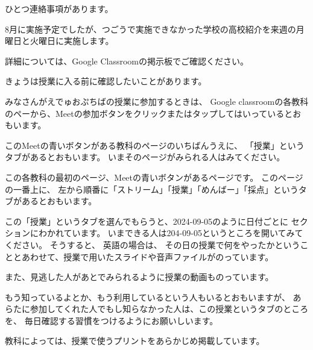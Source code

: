 \documentclass[book,jafontscale=0.9247]{jlreq}
\begin{document}
\newpage

ひとつ連絡事項があります。

8月に実施予定でしたが、つごうで実施できなかった学校の高校紹介を来週の月曜日と火曜日に実施します。

詳細については、Google Classroomの掲示板でご確認ください。


\newpage

きょうは授業に入る前に確認したいことがあります。

みなさんがえでゅおぷちばの授業に参加するときは、
Google classroomの各教科のペーから、Meetの参加ボタンをクリックまたはタップしてはいっているとおもいます。

このMeetの青いボタンがある教科のページのいちばんうえに、
「授業」というタブがあるとおもいます。
いまそのページがみられる人はみてください。

この各教科の最初のページ、Meetの青いボタンがあるページです。
このページの一番上に、
左から順番に「ストリーム」「授業」「めんばー」「採点」というタブがあるとおもいます。

この「授業」というタブを選んでもらうと、2024-09-05のように日付ごとに
セクションにわかれています。
いまできる人は204-09-05というところを開いてみてください。
そうすると、
英語の場合は、
その日の授業で何をやったかということとあわせて、授業で用いたスライドや音声ファイルがのっています。

また、見逃した人があとでみられるように授業の動画ものっています。

もう知っているよとか、もう利用しているという人もいるとおもいますが、
あらたに参加してくれた人でもし知らなかった人は、この授業というタブのところを、
毎日確認する習慣をつけるようにお願いしいます。

教科によっては、授業で使うプリントをあらかじめ掲載しています。
\end{document}
